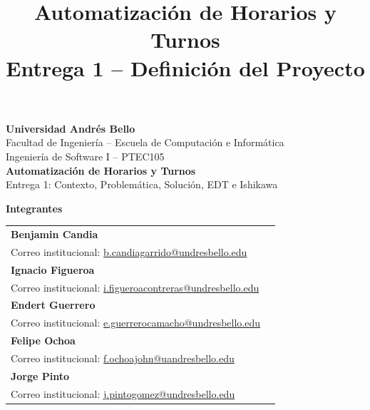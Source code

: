 \documentclass[11pt,letterpaper]{article}
\title{\vspace{-1.5cm}\textbf{Automatización de Horarios y Turnos}\\[0.3em]
\large Entrega 1 -- Definición del Proyecto}
\author{}
\date{}
\begin{document}
\begin{titlepage}
    \centering
    \vspace*{1cm}
    {\Large\bfseries Universidad Andrés Bello}\\[0.2cm]
    {\large Facultad de Ingeniería -- Escuela de Computación e Informática}\\[0.2cm]
    {\large Ingeniería de Software I -- PTEC105}\\[2cm]

    {\Huge\bfseries Automatización de Horarios y Turnos}\\[0.5cm]
    {\Large Entrega 1: Contexto, Problemática, Solución, EDT e Ishikawa}\\[2.5cm]

    \begin{minipage}{0.85\textwidth}
        \centering
        \large\bfseries Integrantes
        \vspace{0.5cm}

        \begin{tabular}{l l}
            \textbf{Benjamin Candia}  & \\[-0.1cm]
            \small Correo institucional: \href{mailto:b.candiagarrido@undresbello.edu}{b.candiagarrido@undresbello.edu} & \\[0.4cm]

            \textbf{Ignacio Figueroa} & \\[-0.1cm]
            \small Correo institucional: \href{mailto:i.figueroacontreras@undresbello.edu}{i.figueroacontreras@undresbello.edu} &  \\[0.4cm]

            \textbf{Endert Guerrero}  & \\[-0.1cm]
            \small Correo institucional: \href{mailto:e.guerrerocamacho@undresbello.edu}{e.guerrerocamacho@undresbello.edu} &  \\[0.4cm]

            \textbf{Felipe Ochoa}     & \\[-0.1cm]
            \small Correo institucional: \href{mailto:f.ochoajohn@uandresbello.edu}{f.ochoajohn@uandresbello.edu}   \\[0.4cm]

            \textbf{Jorge Pinto}      & \\[-0.1cm]
            \small Correo institucional: \href{mailto:j.pintogomez@undresbello.edu}{j.pintogomez@undresbello.edu} &  \\[0.4cm]


\end{tabular}
\end{minipage}
\end{titlepage}
\end{document}
